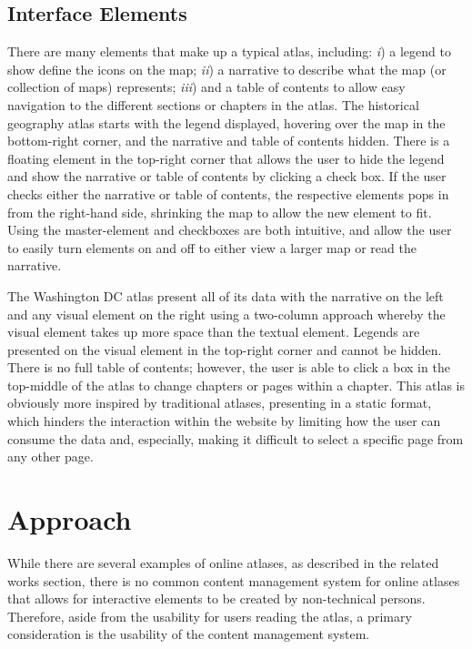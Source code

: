 \documentclass[11pt, draftcls, conference, onecolumn]{IEEEtran}
\begin{document}
\subsection{Interface Elements}
There are many elements that make up a typical atlas, including: {\it i}) a legend to show define the icons on the map; {\it ii}) a narrative to describe what the map (or collection of maps) represents; {\it iii}) and a table of contents to allow easy navigation to the different sections or chapters in the atlas. The historical geography atlas starts with the legend displayed, hovering over the map in the bottom-right corner, and the narrative and table of contents hidden. There is a floating element in the top-right corner that allows the user to hide the legend and show the narrative or table of contents by clicking a check box. If the user checks either the narrative or table of contents, the respective elements pops in from the right-hand side, shrinking the map to allow the new element to fit.~\cite{us-historical-atlas-2014} Using the master-element and checkboxes are both intuitive, and allow the user to easily turn elements on and off to either view a larger map or read the narrative.

The Washington DC atlas present all of its data with the narrative on the left and any visual element on the right using a two-column approach whereby the visual element takes up more space than the textual element. Legends are presented on the visual element in the top-right corner and cannot be hidden. There is no full table of contents; however, the user is able to click a box in the top-middle of the atlas to change chapters or pages within a chapter. This atlas is obviously more inspired by traditional atlases, presenting in a static format, which hinders the interaction within the website by limiting how the user can consume the data and, especially, making it difficult to select a specific page from any other page.

\section{Approach}
While there are several examples of online atlases, as described in the related works section, there is no common content management system for online atlases that allows for interactive elements to be created by non-technical persons. Therefore, aside from the usability for users reading the atlas, a primary consideration is the usability of the content management system.
\end{document}
